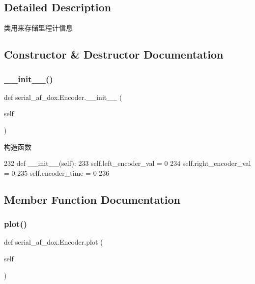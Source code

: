 \subsection{Detailed Description}
类用来存储里程计信息 



\subsection{Constructor \& Destructor Documentation}
\mbox{\label{classserial__af__dox_1_1_encoder_a57f2b90a574f07724da23ebb31d2d9d0}} 
\subsubsection{\texorpdfstring{\+\_\+\+\_\+init\+\_\+\+\_\+()}{\_\_init\_\_()}}
{\footnotesize\ttfamily def serial\+\_\+af\+\_\+dox.\+Encoder.\+\_\+\+\_\+init\+\_\+\+\_\+ (\begin{DoxyParamCaption}\item[{}]{self }\end{DoxyParamCaption})}



构造函数 


\begin{DoxyCode}
232     \textcolor{keyword}{def }\_\_init\_\_(self):
233         self.left\_encoder\_val = 0
234         self.right\_encoder\_val = 0
235         self.encoder\_time = 0
236 
\end{DoxyCode}


\subsection{Member Function Documentation}
\mbox{\label{classserial__af__dox_1_1_encoder_ad71ed14354c914c1d649c202df857215}} 
\subsubsection{\texorpdfstring{plot()}{plot()}}
{\footnotesize\ttfamily def serial\+\_\+af\+\_\+dox.\+Encoder.\+plot (\begin{DoxyParamCaption}\item[{}]{self }\end{DoxyParamCaption})}



